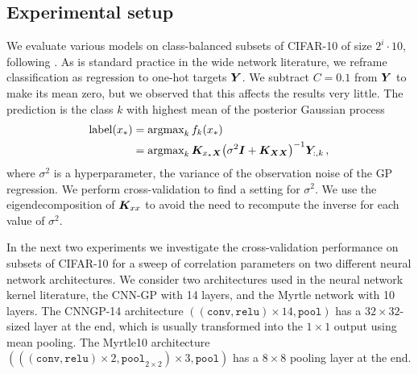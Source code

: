 \documentclass[accepted]{uai2021} %
\newcommand{\0}{\boldsymbol{0}}
\newcommand{\1}{\boldsymbol{1}}
\begin{document}
\subsection{Experimental setup}
We evaluate various models on class-balanced subsets of CIFAR-10 of size $2^i \cdot 10$, following \citet{arora2020small}. As is
standard practice in the wide network literature, we reframe classification as
regression to one-hot targets ${\bm{Y}}$. %
We subtract $C=0.1$ from ${\bm{Y}}$ to make its mean zero, but we observed that this affects the results very little. The prediction is the class $k$ with highest mean of the posterior Gaussian process
\begin{align}
\text{label}(x_*) &= \text{argmax}_k \,f_k(x_*) \nonumber \\
&= \text{argmax}_k \,{\bm{K}}_{x_* {\bm{X}}}{\left( \sigma^2{{\bm{I}}} + {\bm{K}}_{{\bm{X}}{\bm{X}}} \right)}^{-1}{\bm{Y}}_{:,k}\,,
\label{eq:mean-gp}
\end{align}
where $\sigma^2$ is a hyperparameter, the variance of the observation noise of the GP regression. We perform cross-validation to find a setting for $\sigma^2$. We use the eigendecomposition of ${\bm{K}}_{xx}$ to avoid the need to recompute the inverse for each value of $\sigma^2$.

In the next two experiments we investigate the cross-validation performance on subsets of CIFAR-10 for a sweep of correlation parameters on two different neural network architectures.
We consider two architectures used in the neural network kernel literature, the CNN-GP \citep{novak2019infiniteconv,arora2019exact} with 14 layers, and the Myrtle network \citep{shankar2020without} with 10 layers. The CNNGP-14 architecture $((\texttt{conv}, \texttt{relu})\times 14, \texttt{pool})$ has a $32 \times 32$-sized layer at the end, which is usually transformed into the $1 \times 1$ output using mean pooling. The Myrtle10 architecture $(((\texttt{conv},\texttt{relu})\times 2, \texttt{pool}_{2\times 2}) \times 3, \texttt{pool})$ has a $8\times 8$ pooling layer at the end.
\end{document}

